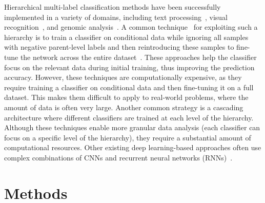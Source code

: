 \documentclass[review,1p,times,numbers]{elsarticle}
\begin{document}
Hierarchical multi-label classification methods have been successfully implemented in a variety of domains, including text processing~\cite{aly_Hierarchical_2019}, visual recognition~\cite{bi_Mandatory_2014}, and genomic analysis~\cite{bi_BayesOptimal_2015}. A common technique~\cite{chen_Deep_2019} for exploiting such a hierarchy is to train a classifier on conditional data while ignoring all samples with negative parent-level labels and then reintroducing these samples to fine-tune the network across the entire dataset~\cite{chen_Deep_2019}. These approaches help the classifier focus on the relevant data during initial training, thus improving the prediction accuracy.  However, these techniques are computationally expensive, as they require training a classifier on conditional data and then fine-tuning it on a full dataset. This makes them difficult to apply to real-world problems, where the amount of data is often very large.   Another common strategy is a cascading architecture where different classifiers are trained at each level of the hierarchy. Although these techniques enable more granular data analysis (each classifier can focus on a specific level of the hierarchy), they require a substantial amount of computational resources. Other existing deep learning-based approaches often use complex combinations of CNNs and recurrent neural networks (RNNs)~\cite{guo_CNNRNN_2018,kowsari_HDLTex_2017}.

\section{Methods}\label{sec:taxonomy.methods}
\end{document}
